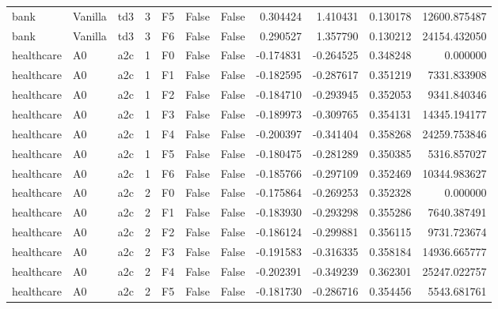 \begin{tabular}{lllrlllrrrr}
      bank & Vanilla &       td3 &     3 &  F5 &           False &            False &  0.304424 &  1.410431 & 0.130178 &     12600.875487 \\
      bank & Vanilla &       td3 &     3 &  F6 &           False &            False &  0.290527 &  1.357790 & 0.130212 &     24154.432050 \\
healthcare &      A0 &       a2c &     1 &  F0 &           False &            False & -0.174831 & -0.264525 & 0.348248 &         0.000000 \\
healthcare &      A0 &       a2c &     1 &  F1 &           False &            False & -0.182595 & -0.287617 & 0.351219 &      7331.833908 \\
healthcare &      A0 &       a2c &     1 &  F2 &           False &            False & -0.184710 & -0.293945 & 0.352053 &      9341.840346 \\
healthcare &      A0 &       a2c &     1 &  F3 &           False &            False & -0.189973 & -0.309765 & 0.354131 &     14345.194177 \\
healthcare &      A0 &       a2c &     1 &  F4 &           False &            False & -0.200397 & -0.341404 & 0.358268 &     24259.753846 \\
healthcare &      A0 &       a2c &     1 &  F5 &           False &            False & -0.180475 & -0.281289 & 0.350385 &      5316.857027 \\
healthcare &      A0 &       a2c &     1 &  F6 &           False &            False & -0.185766 & -0.297109 & 0.352469 &     10344.983627 \\
healthcare &      A0 &       a2c &     2 &  F0 &           False &            False & -0.175864 & -0.269253 & 0.352328 &         0.000000 \\
healthcare &      A0 &       a2c &     2 &  F1 &           False &            False & -0.183930 & -0.293298 & 0.355286 &      7640.387491 \\
healthcare &      A0 &       a2c &     2 &  F2 &           False &            False & -0.186124 & -0.299881 & 0.356115 &      9731.723674 \\
healthcare &      A0 &       a2c &     2 &  F3 &           False &            False & -0.191583 & -0.316335 & 0.358184 &     14936.665777 \\
healthcare &      A0 &       a2c &     2 &  F4 &           False &            False & -0.202391 & -0.349239 & 0.362301 &     25247.022757 \\
healthcare &      A0 &       a2c &     2 &  F5 &           False &            False & -0.181730 & -0.286716 & 0.354456 &      5543.681761 \\

\end{tabular}
